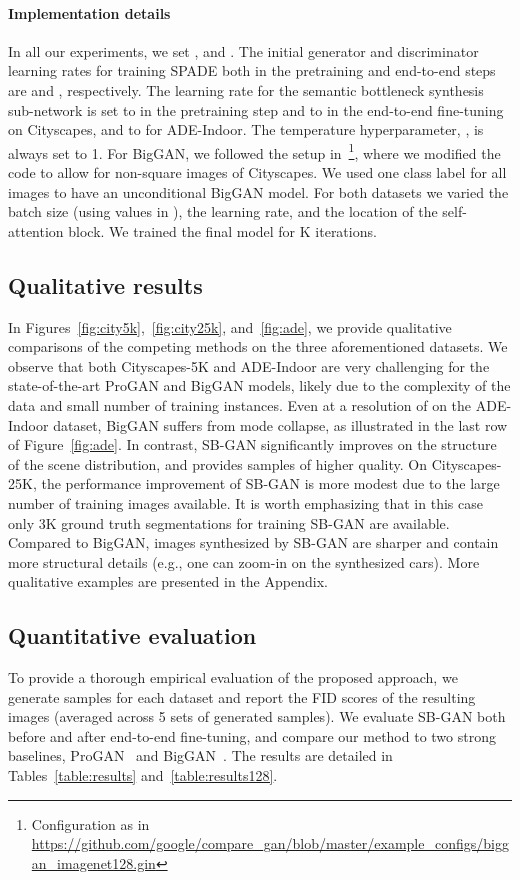 \documentclass[10pt,twocolumn,letterpaper]{article}
\begin{document}
{\paragraph{Implementation details} In all our experiments, we set , and . The initial generator and discriminator learning rates for training SPADE both in the pretraining and end-to-end steps are  and , respectively. The learning rate for the semantic bottleneck synthesis sub-network is set to  in the pretraining step and to  in the end-to-end fine-tuning on Cityscapes, and to  for ADE-Indoor. The temperature hyperparameter, , is always set to 1.
For BigGAN, we followed the setup in~\cite{luvcic2019high}\footnote{Configuration as in \url{https://github.com/google/compare_gan/blob/master/example_configs/biggan_imagenet128.gin}}, where we modified the code to allow for non-square images of Cityscapes. We used one class label for all images to have an unconditional BigGAN model. For both datasets we varied the batch size (using values in ), the learning rate, and the location of the self-attention block. We trained the final model for K iterations.

\subsection{Qualitative results}
In Figures~\ref{fig:city5k},~\ref{fig:city25k}, and~\ref{fig:ade}, we provide qualitative comparisons of the competing methods on the three aforementioned datasets. We observe that both Cityscapes-5K and ADE-Indoor are very challenging for the state-of-the-art ProGAN and BigGAN models, likely due to the complexity of the data and small number of training instances. Even at a resolution of  on the ADE-Indoor dataset, BigGAN suffers from mode collapse, as illustrated in the last row of Figure~\ref{fig:ade}. In contrast, SB-GAN significantly improves on the structure of the scene distribution, and provides samples of higher quality. On Cityscapes-25K, the performance improvement of SB-GAN is more modest due to the large number of training images available. It is worth emphasizing that in this case only 3K ground truth segmentations for training SB-GAN are available. Compared to BigGAN, images synthesized by SB-GAN are sharper and contain more structural details (e.g., one can zoom-in on the synthesized cars). More qualitative examples are presented in the Appendix.


\subsection{Quantitative evaluation}
To provide a thorough empirical evaluation of the proposed approach, we generate samples for each dataset and report the FID scores of the resulting images (averaged across 5 sets of generated samples).
We evaluate SB-GAN both before and after end-to-end fine-tuning, and compare our method to two strong baselines, ProGAN~\cite{PGGAN} and BigGAN~\cite{biggan}. The results are detailed in Tables~\ref{table:results} and~\ref{table:results128}.


}
\end{document}
